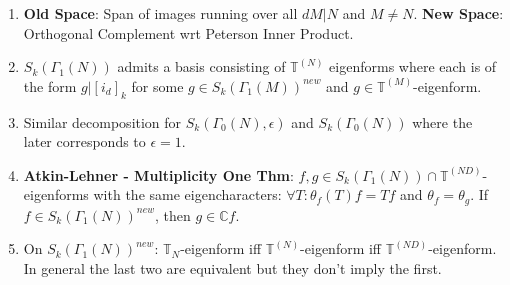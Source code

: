 \documentclass{article}
\newcommand{\C}{\mathbb{C}}
\begin{document}
\begin{multicols}{2}
\begin{enumerate}
\item \textbf{Old Space}: Span of images running over all $dM|N$ and $M \neq N$. \textbf{New Space}: Orthogonal Complement wrt Peterson Inner Product. 

\item $S_k(\Gamma_1(N))$ admits a basis consisting of $\mathbb{T}^{(N)}$ eigenforms where each is of the form $g|[i_d]_k$ for some $g \in S_k(\Gamma_1(M))^{new}$ and $g \in \mathbb{T}^{(M)}$-eigenform. 

\item Similar decomposition for $S_k(\Gamma_0(N),\epsilon)$ and $S_k(\Gamma_0(N))$ where the later corresponds to $\epsilon = 1$.   

\item \textbf{Atkin-Lehner - Multiplicity One Thm}: $f,g \in S_k(\Gamma_1(N)) \cap \mathbb{T}^{(ND)}$-eigenforms with the same eigencharacters: $\forall T: \theta_f(T)f = Tf$ and $\theta_f = \theta_g$. If $f \in S_k(\Gamma_1(N))^{new}$, then $g \in \C f$. 

\item On $S_k(\Gamma_1(N))^{new}$: $\mathbb{T}_N$-eigenform iff $\mathbb{T}^{(N)}$-eigenform iff $\mathbb{T}^{(ND)}$-eigenform. In general the last two are equivalent but they don't imply the first.  

 
\end{enumerate}
\end{multicols}
\end{document}
